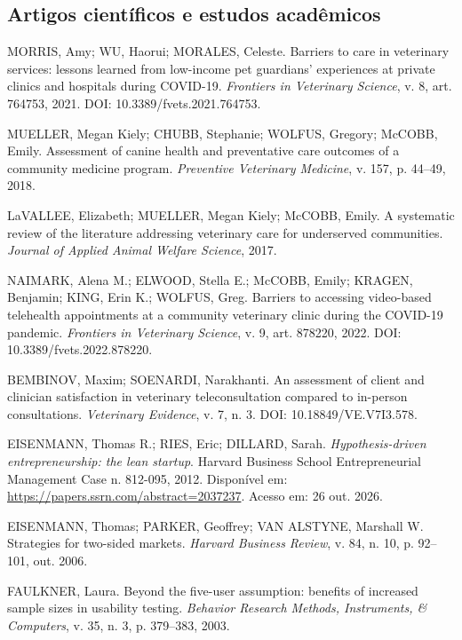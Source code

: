 \documentclass[12pt,a4paper]{article}
\begin{document}
\subsection*{Artigos científicos e estudos acadêmicos}
\begin{enumerate}[label={[\arabic*]},leftmargin=1.3cm,itemsep=0.2em,resume]
\item MORRIS, Amy; WU, Haorui; MORALES, Celeste. Barriers to care in veterinary services: lessons learned from low-income pet guardians' experiences at private clinics and hospitals during COVID-19. \textit{Frontiers in Veterinary Science}, v. 8, art. 764753, 2021. DOI: 10.3389/fvets.2021.764753.
\item MUELLER, Megan Kiely; CHUBB, Stephanie; WOLFUS, Gregory; McCOBB, Emily. Assessment of canine health and preventative care outcomes of a community medicine program. \textit{Preventive Veterinary Medicine}, v. 157, p. 44--49, 2018.
\item LaVALLEE, Elizabeth; MUELLER, Megan Kiely; McCOBB, Emily. A systematic review of the literature addressing veterinary care for underserved communities. \textit{Journal of Applied Animal Welfare Science}, 2017.
\item NAIMARK, Alena M.; ELWOOD, Stella E.; McCOBB, Emily; KRAGEN, Benjamin; KING, Erin K.; WOLFUS, Greg. Barriers to accessing video-based telehealth appointments at a community veterinary clinic during the COVID-19 pandemic. \textit{Frontiers in Veterinary Science}, v. 9, art. 878220, 2022. DOI: 10.3389/fvets.2022.878220.
\item BEMBINOV, Maxim; SOENARDI, Narakhanti. An assessment of client and clinician satisfaction in veterinary teleconsultation compared to in-person consultations. \textit{Veterinary Evidence}, v. 7, n. 3. DOI: 10.18849/VE.V7I3.578.
\item EISENMANN, Thomas R.; RIES, Eric; DILLARD, Sarah. \textit{Hypothesis-driven entrepreneurship: the lean startup}. Harvard Business School Entrepreneurial Management Case n. 812-095, 2012. Disponível em: \url{https://papers.ssrn.com/abstract=2037237}. Acesso em: 26 out. 2026.
\item EISENMANN, Thomas; PARKER, Geoffrey; VAN ALSTYNE, Marshall W. Strategies for two-sided markets. \textit{Harvard Business Review}, v. 84, n. 10, p. 92--101, out. 2006.
\item FAULKNER, Laura. Beyond the five-user assumption: benefits of increased sample sizes in usability testing. \textit{Behavior Research Methods, Instruments, \& Computers}, v. 35, n. 3, p. 379--383, 2003.

\end{enumerate}
\end{document}
